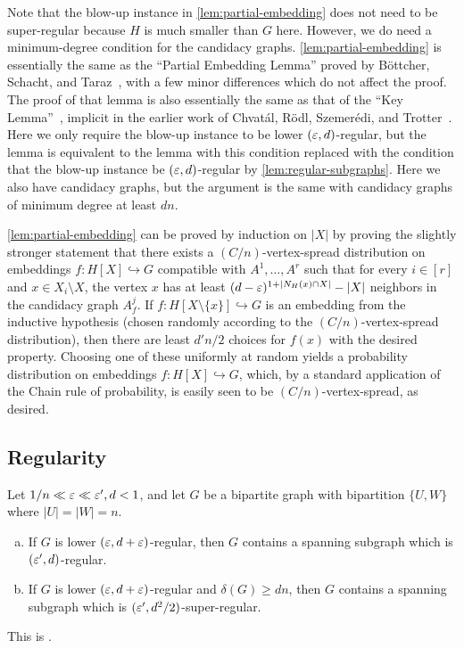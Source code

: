 \documentclass[11pt]{amsart}
\begin{document}
Note that the blow-up instance in \cref{lem:partial-embedding} does not need to be super-regular because $H$ is much smaller than $G$ here.  However, we do need a minimum-degree condition for the candidacy graphs.  \cref{lem:partial-embedding} is essentially the same as the ``Partial Embedding Lemma'' proved by B\"{o}ttcher, Schacht, and Taraz~\cite[Lemma 10]{BST08}, with a few minor differences which do not affect the proof.  The proof of that lemma is also essentially the same as that of the ``Key Lemma''~\cite{Ko99}, implicit in the earlier work of Chvat\'{a}l, R\"{o}dl, Szemer\'{e}di, and Trotter~\cite{CRST83}.  Here we only require the blow-up instance to be lower $(\varepsilon, d)$-regular, but the lemma is equivalent to the lemma with this condition replaced with the condition that the blow-up instance be $(\varepsilon, d)$-regular by \cref{lem:regular-subgraphs}.  Here we also have candidacy graphs, but the argument is the same with candidacy graphs of minimum degree at least $d n$.

\cref{lem:partial-embedding} can be proved by induction on $|X|$ by proving the slightly stronger statement that there exists a $(C / n)$-vertex-spread distribution on embeddings $f : H[X] \hookrightarrow G$ compatible with $A^1, \dots, A^r$ such that for every $i \in [r]$ and $x \in X_i \setminus X$, the vertex $x$ has at least $(d - \varepsilon)^{1 + |N_H(x)\cap X|} - |X|$ neighbors in the candidacy graph $A^j_f$.  If $f : H[X\setminus \{x\}] \hookrightarrow G$ is an embedding from the inductive hypothesis (chosen randomly according to the $(C/n)$-vertex-spread distribution), then there are least $d'n / 2$ choices for $f(x)$ with the desired property. 
 Choosing one of these uniformly at random yields a probability distribution on embeddings $f : H[X] \hookrightarrow G$, which, by a standard application of the Chain rule of probability, is easily seen to be $(C / n)$-vertex-spread, as desired.

\subsection{Regularity}



\begin{lemma}\label{lem:regular-subgraphs}
    Let $1 / n \ll \varepsilon \ll \varepsilon', d < 1$, and let $G$ be a bipartite graph with bipartition $\{U, W\}$ where $|U| = |W| = n$.
    \begin{enumerate}[(a)]
    \item If $G$ is lower $(\varepsilon, d + \varepsilon)$-regular, then $G$ contains a spanning subgraph which is $(\varepsilon', d)$-regular.
    \item If $G$ is lower $(\varepsilon, d + \varepsilon)$-regular and $\delta(G) \geq dn$, then $G$ contains a spanning subgraph which is $(\varepsilon', d^2 / 2)$-super-regular.
    \end{enumerate}
\end{lemma}
This is \cite[Fact 2]{RR99}.
\end{document}
